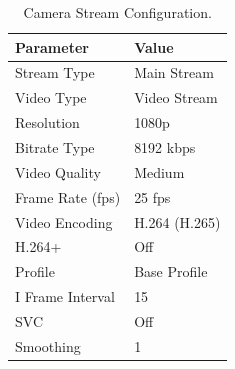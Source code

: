 \begin{table}[H]
    \centering
    \caption{Camera Stream Configuration.}\label{tab:camera_stream_config}
    \begin{tabular}{|l|l|}
    \hline
    \textbf{Parameter} & \textbf{Value} \\
    \hline
    Stream Type        &  Main Stream \\
    \hline
    Video Type         &  Video Stream \\
    \hline
    Resolution         &  1080p \\
    \hline
    Bitrate Type       &  8192 kbps \\
    \hline
    Video Quality      &  Medium \\
    \hline
    Frame Rate (fps)   &  25 fps \\
    \hline
    Video Encoding     &  H.264 (H.265\*)\\
    \hline
    H.264+             &  Off \\
    \hline
    Profile            &  Base Profile \\
    \hline
    I Frame Interval   &  15 \\
    \hline
    SVC                &  Off \\
    \hline
    Smoothing          &  1 \\
    \hline
    \end{tabular}
\end{table}
